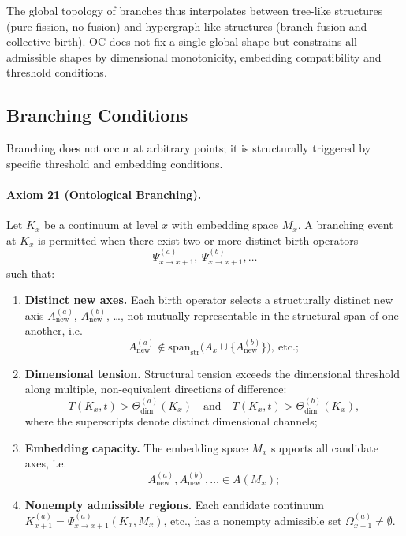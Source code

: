 The global topology of branches thus interpolates between tree-like structures
(pure fission, no fusion) and hypergraph-like structures (branch fusion and
collective birth). OC does not fix a single global shape but constrains all
admissible shapes by dimensional monotonicity, embedding compatibility and
threshold conditions.

\subsection{Branching Conditions}

Branching does not occur at arbitrary points; it is structurally triggered by
specific threshold and embedding conditions.

\paragraph{Axiom 21 (Ontological Branching).}
Let \(K_x\) be a continuum at level \(x\) with embedding space \(M_x\). A
branching event at \(K_x\) is permitted when there exist two or more distinct
birth operators
\[
  \Psi_{x\to x+1}^{(a)},\ \Psi_{x\to x+1}^{(b)},\dots
\]
such that:
\begin{enumerate}
  \item \textbf{Distinct new axes.}\quad
        Each birth operator selects a structurally distinct new axis
        \(A_{\mathrm{new}}^{(a)}\), \(A_{\mathrm{new}}^{(b)}\), \dots,
        not mutually representable in the structural span of one another, i.e.
        \[
          A_{\mathrm{new}}^{(a)} \notin \mathrm{span}_{\mathrm{str}}
            \big(A_x \cup \{A_{\mathrm{new}}^{(b)}\}\big), \ \text{etc.};
        \]
  \item \textbf{Dimensional tension.}\quad
        Structural tension exceeds the dimensional threshold along multiple,
        non-equivalent directions of difference:
        \[
          T(K_x,t) > \Theta_{\mathrm{dim}}^{(a)}(K_x)
          \quad\text{and}\quad
          T(K_x,t) > \Theta_{\mathrm{dim}}^{(b)}(K_x),
        \]
        where the superscripts denote distinct dimensional channels;
  \item \textbf{Embedding capacity.}\quad
        The embedding space \(M_x\) supports all candidate axes, i.e.
        \[
          A_{\mathrm{new}}^{(a)}, A_{\mathrm{new}}^{(b)}, \dots
          \in A(M_x);
        \]
  \item \textbf{Nonempty admissible regions.}\quad
        Each candidate continuum
        \(K_{x+1}^{(a)} = \Psi_{x\to x+1}^{(a)}(K_x, M_x)\), etc., has
        a nonempty admissible set \(\Omega_{x+1}^{(a)}\neq\emptyset\).
\end{enumerate}

